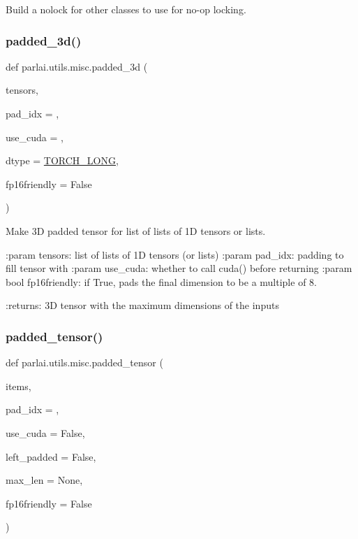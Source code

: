 \begin{DoxyVerb}Build a nolock for other classes to use for no-op locking.
\end{DoxyVerb}
 \mbox{\label{namespaceparlai_1_1utils_1_1misc_ad96b0c9ef6237d9ca051251089faf2c7}} 
\subsubsection{\texorpdfstring{padded\+\_\+3d()}{padded\_3d()}}
{\footnotesize\ttfamily def parlai.\+utils.\+misc.\+padded\+\_\+3d (\begin{DoxyParamCaption}\item[{}]{tensors,  }\item[{}]{pad\+\_\+idx = {},  }\item[{}]{use\+\_\+cuda = {},  }\item[{}]{dtype = {\ttfamily \hyperlink{namespaceparlai_1_1utils_1_1misc_ac49ec9bcd5fe586085eb9fab8f40fdb5}{T\+O\+R\+C\+H\+\_\+\+L\+O\+NG}},  }\item[{}]{fp16friendly = {\ttfamily False} }\end{DoxyParamCaption})}

\begin{DoxyVerb}Make 3D padded tensor for list of lists of 1D tensors or lists.

:param tensors:
    list of lists of 1D tensors (or lists)
:param pad_idx:
    padding to fill tensor with
:param use_cuda:
    whether to call cuda() before returning
:param bool fp16friendly:
    if True, pads the final dimension to be a multiple of 8.

:returns:
    3D tensor with the maximum dimensions of the inputs
\end{DoxyVerb}
 \mbox{\label{namespaceparlai_1_1utils_1_1misc_ad3f3c350e8b394482f73a240e19ec3ac}} 
\subsubsection{\texorpdfstring{padded\+\_\+tensor()}{padded\_tensor()}}
{\footnotesize\ttfamily def parlai.\+utils.\+misc.\+padded\+\_\+tensor (\begin{DoxyParamCaption}\item[{}]{items,  }\item[{}]{pad\+\_\+idx = {},  }\item[{}]{use\+\_\+cuda = {\ttfamily False},  }\item[{}]{left\+\_\+padded = {\ttfamily False},  }\item[{}]{max\+\_\+len = {\ttfamily None},  }\item[{}]{fp16friendly = {\ttfamily False} }\end{DoxyParamCaption})}

